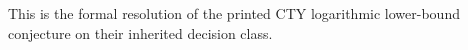 This is the formal resolution of the printed CTY logarithmic lower-bound conjecture on their inherited decision class.